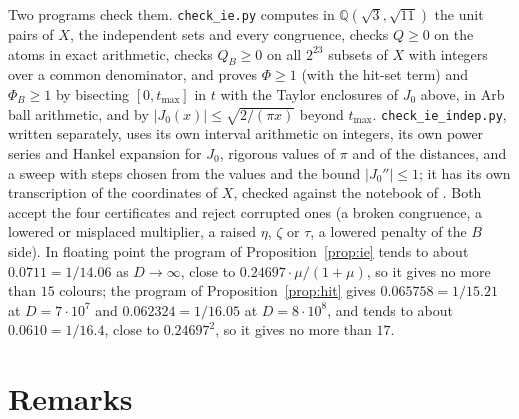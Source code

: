 \documentclass[11pt,a4paper]{amsart}
\theoremstyle{definition}
\theoremstyle{remark}
\newcommand{\Q}{\mathbb{Q}}
\begin{document}
Two programs check them. \texttt{check\_ie.py} computes in $\Q(\sqrt3,\sqrt{11})$ the unit pairs of $X$, the
independent sets and every congruence, checks $Q\ge0$ on the atoms in exact arithmetic, checks $Q_B\ge0$ on all
$2^{23}$ subsets of $X$ with integers over a common denominator, and proves $\Phi\ge1$ (with the hit-set term) and
$\Phi_B\ge1$ by bisecting $[0,t_{\max}]$ in $t$ with the Taylor enclosures of $J_0$ above, in Arb ball arithmetic, and
by $|J_0(x)|\le\sqrt{2/(\pi x)}$ beyond $t_{\max}$. \texttt{check\_ie\_indep.py}, written separately, uses its own interval
arithmetic on integers, its own power series and Hankel expansion for $J_0$, rigorous values of $\pi$ and of the
distances, and a sweep with steps chosen from the values and the bound $|J_0''|\le1$; it has its own transcription of the
coordinates of $X$, checked against the notebook of \cite{ACMVZ}. Both accept the four certificates and reject corrupted ones (a broken congruence, a
lowered or misplaced multiplier, a raised $\eta$, $\zeta$ or $\tau$, a lowered penalty of the $B$ side). In floating
point the program of Proposition~\ref{prop:ie} tends to about $0.0711=1/14.06$ as $D\to\infty$, close to
$0.24697\cdot\mu/(1+\mu)$, so it gives no more than $15$ colours; the program of Proposition~\ref{prop:hit} gives
$0.065758=1/15.21$ at $D=7\cdot10^7$ and $0.062324=1/16.05$ at $D=8\cdot10^8$, and tends to about $0.0610=1/16.4$, close to $0.24697^2$, so it gives no more than $17$.


\section{Remarks}
\end{document}

